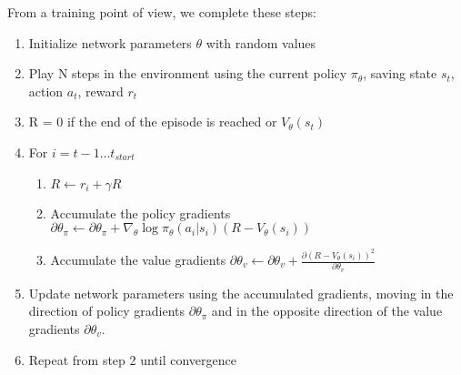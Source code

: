 From a training point of view, we complete these steps:
\begin{enumerate}
\item Initialize network parameters \begin{math}\theta\end{math} with random values
\item
  Play N steps in the environment using the current
  policy \begin{math}\pi_\theta\end{math}, saving
    state $s_t$, action $a_t$, reward $r_t$
  \item  R = 0 if the end of the episode is reached or \begin{math}V_\theta(s_t)\end{math}
  \item
    For \begin{math}i = t-1 \ldots t_{start}\end{math}
    
    \begin{enumerate}
\item \begin{math}R \leftarrow r_i + \gamma R\end{math}
\item Accumulate the policy gradients \begin{math} \partial\theta_\pi \leftarrow
  \partial\theta_\pi + \nabla_\theta \log \pi_\theta(a_i|s_i)(R - V_\theta(s_i)) \end{math}
\item Accumulate the value gradients \begin{math}\partial \theta_v \leftarrow
  \partial \theta_v + \frac{\partial (R - V_\theta(s_i))^2}{\partial \theta_v}\end{math}
    \end{enumerate}

\item Update network parameters using the accumulated gradients, moving in the
  direction of policy gradients \begin{math}\partial\theta_\pi\end{math} and in
    the opposite direction of the value gradients \begin{math}\partial \theta_v\end{math}.
\item Repeat from step 2 until convergence

\end{enumerate}


